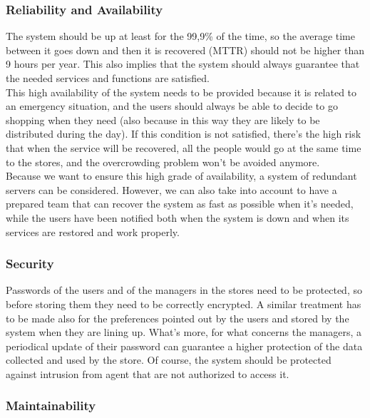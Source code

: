 \documentclass[]{article}
\begin{document}
			\subsubsection{Reliability and Availability}
			
			The  system should be up at least for the 99,9\% of the time, so the average time between it goes down and then it is recovered (MTTR) should not be higher than 9 hours per year. This also implies that the system should always guarantee that the needed services and functions are satisfied.\\
This high availability of the system needs to be provided because it is related to an emergency situation, and the users should always be able to decide to go shopping when they need (also because in this way they are likely to be distributed during the day). If this condition is not satisfied, there’s the high risk that when the service will be recovered,  all the people would go at the same time to the stores, and the overcrowding problem won’t be avoided anymore.\\
Because we want to ensure this high grade of availability, a system of redundant servers can be considered. However, we can also take into account to have a prepared team that can recover the system as fast as possible when it’s needed, while the users have been notified both when the system is down and when its services are restored and work properly.\\

			\subsubsection{Security}
			
			Passwords of the users and of the managers in the stores need to be protected, so before storing them they need to be correctly encrypted. A similar treatment has to be made also for the preferences pointed out by the users and stored by the system when they are lining up. What’s more,  for what concerns the managers, a periodical update of their password can guarantee a higher protection of the data collected and used by the store. Of course, the system should be protected against intrusion from agent that are not authorized to access it. \\
			
			\subsubsection{Maintainability}
			
\end{document}
